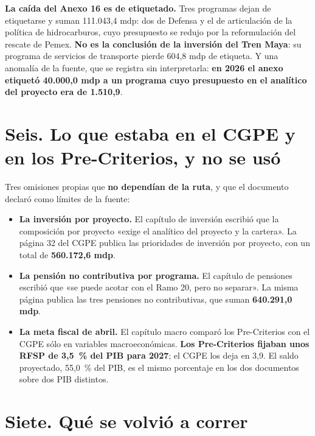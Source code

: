 

\textbf{La caída del Anexo 16 es de etiquetado.} Tres programas dejan de etiquetarse y suman
111.043,4 mdp: dos de Defensa y el de articulación de la política de hidrocarburos, cuyo
presupuesto se redujo por la reformulación del rescate de Pemex. \textbf{No es la conclusión
de la inversión del Tren Maya}: su programa de servicios de transporte pierde 604,8 mdp de
etiqueta. Y una anomalía de la fuente, que se registra sin interpretarla: \textbf{en 2026 el
anexo etiquetó 40.000,0 mdp a un programa cuyo presupuesto en el analítico del proyecto era
de 1.510,9}.

\section*{Seis. Lo que estaba en el CGPE y en los Pre-Criterios, y no se usó}

Tres omisiones propias que \textbf{no dependían de la ruta}, y que el documento declaró como
límites de la fuente:
\begin{itemize}
\item \textbf{La inversión por proyecto.} El capítulo de inversión escribió que la
composición por proyecto «exige el analítico del proyecto y la cartera». La página 32 del
CGPE publica las prioridades de inversión por proyecto, con un total de \textbf{560.172,6
mdp}.
\item \textbf{La pensión no contributiva por programa.} El capítulo de pensiones escribió que
«se puede acotar con el Ramo 20, pero no separar». La misma página publica las tres pensiones
no contributivas, que suman \textbf{640.291,0 mdp}.
\item \textbf{La meta fiscal de abril.} El capítulo macro comparó los Pre-Criterios con el
CGPE sólo en variables macroeconómicas. \textbf{Los Pre-Criterios fijaban unos RFSP de
3,5~\% del PIB para 2027}; el CGPE los deja en 3,9. El saldo proyectado, 55,0~\% del PIB, es el
mismo porcentaje en los dos documentos sobre dos PIB distintos.
\end{itemize}

\section*{Siete. Qué se volvió a correr}

